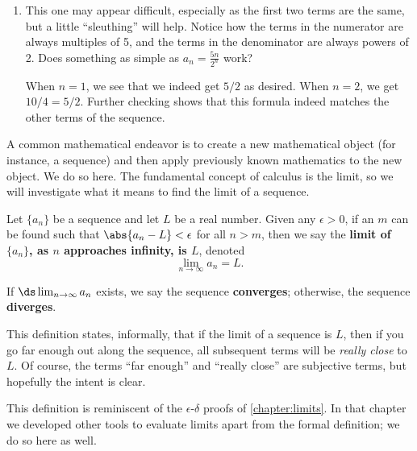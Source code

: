 \begin{example}
\begin{enumerate}
\item		This one may appear difficult, especially as the first two terms are the same, but a little ``sleuthing'' will help. Notice how the terms in the numerator are always multiples of 5, and the terms in the denominator are always powers of 2. Does something as simple as $a_n = \frac{5n}{2^n}$ work?

When $n=1$, we see that we indeed get $5/2$ as desired. When $n=2$, we get $10/4 = 5/2$. Further checking shows that this formula indeed matches the other terms of the sequence.
\end{enumerate}
\end{example}

A common mathematical endeavor is to create a new mathematical object (for instance, a sequence) and then apply previously known mathematics to the new object. We do so here. The fundamental concept of calculus is the limit, so we will investigate what it means to find the limit of a sequence.

\begin{definition}\label{def:seq_limit}
Let $\{a_n\}$ be a sequence and let $L$ be a real number. Given any $\epsilon>0$, if an $m$ can be found such that $\abs{a_n-L}<\epsilon$ for all $n>m$, then we say the \textbf{limit of $\{a_n\}$, as $n$ approaches infinity, is $L$}, denoted \[\lim_{n\to\infty}a_n = L.\]

If $\ds\lim_{n\to\infty} a_n$ exists, we say the sequence \textbf{converges}; otherwise, the sequence \textbf{diverges}.
\end{definition}

This definition states, informally, that if the limit of a sequence is $L$, then if you go far enough out along the sequence, all subsequent terms will be \emph{really close} to $L$. Of course, the terms ``far enough'' and ``really close'' are subjective terms, but hopefully the intent is clear.

This definition is reminiscent of the $\epsilon$-$\delta$ proofs of \autoref{chapter:limits}. In that chapter we developed other tools to evaluate limits apart from the formal definition; we do so here as well.

